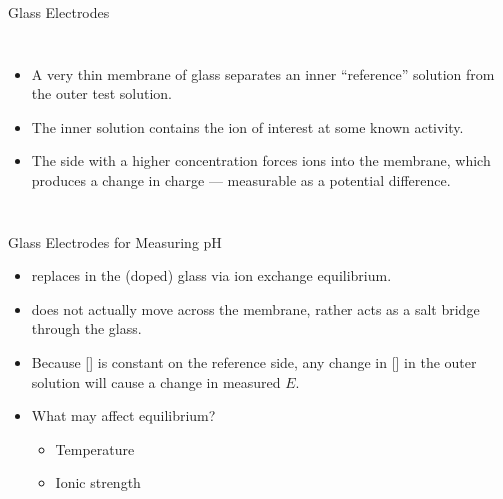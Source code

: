 \documentclass[notes=show]{beamer}
\begin{document}
\begin{frame}[allowframebreaks]{Glass Electrodes}
	\begin{columns}
	\begin{itemize}
		\item A very thin membrane of glass separates an
			inner ``reference'' solution from the
			outer test solution.
		\item The inner solution contains the ion of interest at some
			\alert{known} activity.
		\item The side with a higher concentration
			forces ions into the membrane, which
			produces a change in charge ---
			measurable as a potential difference.
	\end{itemize}
	\end{columns}
\end{frame}

\begin{frame}{Glass Electrodes for Measuring pH}
	\begin{itemize}
		\item {} replaces  in the (doped) glass via
			\alert{ion exchange equilibrium}.
		\item {} does not actually move across the membrane, rather
			 acts as a salt bridge through the glass.
		\item Because [] is constant on the reference side, any
			change in [] in the outer solution will cause a
			change in measured $E$.

			\bigskip

		\item What may affect equilibrium?
			\begin{itemize}
				\item<2-> Temperature
				\item<2-> Ionic strength
			\end{itemize}
	\end{itemize}
\end{frame}
\end{document}
